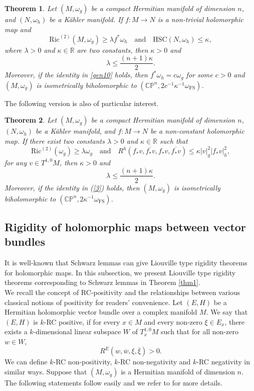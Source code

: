 \documentclass[12pt]{amsart}
\theoremstyle{plain}
\newtheorem{thm}{Theorem}[section]
\theoremstyle{definition}
\newcommand{\btheorem}{\begin{thm}}
\newcommand{\etheorem}{\end{thm}}
\renewcommand{\bar}{\overline}
\newcommand{\beq}{\begin{equation}}
\newcommand{\eeq}{\end{equation}}
\renewcommand{\hat}{\widehat}
\newcommand{\qtq}[1]{\quad\mbox{#1}\quad}
\renewcommand{\>}{\rightarrow}
\newcommand{\C}{{\mathbb C}}
\renewcommand{\P}{{\mathbb P}}
\newcommand{\R}{{\mathbb R}}
\newcommand{\Ric}{\mathrm{Ric}}
\newcommand{\om}{\omega}
\numberwithin{equation}{section} %
\begin{document}
\btheorem \label{main000}
Let $(M,\om_g)$ be a compact Hermitian manifold of dimension $n$,
and $(N,\om_h)$ be a K\"ahler manifold.  If  $f:M\to N$ is  a non-trivial holomorphic map and
\beq \Ric^{\mathrm{(2)}}(M, \omega_g) \ge \lambda f^*\omega_h\qtq{and} \mathrm{HSC}(N,\omega_h)\leq \kappa,
\label{gen1 condition0}
\eeq
where  $\lambda>0$ and $\kappa\in \R$ are two constants, then $\kappa>0$ and
\beq
\lambda\le \frac{\left(n+1\right)\kappa}{2}.  \label{gen10}
\eeq
Moreover, if the identity  in \eqref{gen10} holds,
then $f^*\om_h=c\om_g$ for some $c>0$
and $(M,\om_g)$ is isometrically biholomorphic to $\left(\C\P^n,2c^{-1}\kappa^{-1}\om_{\mathrm{FS}}\right)$.
\etheorem


\baselineskip

\noindent
The following  version  is also of particular interest.

\btheorem\label{11relative}
Let $(M,\om_g)$ be a compact Hermitian manifold of dimension $n$, $(N,\om_h)$ be a K\"ahler manifold,
and $f:M\to N$ be a non-constant holomorphic map.
If there exist two constants $\lambda>0$ and $\kappa\in \R$ such that 
\beq 
\Ric^{\mathrm{(2)}}(\omega_g)\ge \lambda \omega_g\qtq{and} R^h\left(f_*v,\bar{f_*v}, f_*v,\bar {f_*v}\right)\le \kappa |v|^2_g |f_*v|^2_h, 
\label{curvature11relative}
\eeq 	
for any $v\in T^{1,0}M$, then  $\kappa>0$ and
\beq
\lambda\le  \frac{\left(n+1\right)\kappa}{2}.\label{3}
\eeq 
Moreover, if the identity in (\ref{3}) holds, then $(M,\om_g)$ is isometrically biholomorphic to $\left(\C\P^n,2\kappa^{-1}\om_{\mathrm{FS}}\right)$.

\etheorem









\baselineskip


\subsection{Rigidity of holomorphic maps between vector bundles} It is well-known that Schwarz lemmas can give Liouville type rigidity theorems for holomorphic maps.  In this subsection, we present Liouville type rigidity theorems corresponding to Schwarz lemmas in Theorem \ref{thm1}.\\


We recall the concept of RC-positivity and the relationships between various classical notions of positivity for readers' convenience.  Let $(E,H)$ be a Hermitian holomorphic vector bundle over a complex manifold $M$.
We say that $(E,H)$ is $k$-RC positive, if for every $x\in M$ and every non-zero $\xi\in E_x$,
there exists a $k$-dimensional linear subspace $W$ of $T_x^{1,0}M$ such that for all non-zero $w\in W$,
\[
R^{E}\left(w,\bar{w},\xi,\bar \xi\right)>0.
\]
We can define $k$-RC non-positivity, $k$-RC non-negativity  and
$k$-RC negativity  in similar ways.  Suppose that $(M,\omega_g)$ is
a Hermitian manifold of dimension $n$.  The following statements
follow easily and we refer to \cite{Yan2018} for more details.
\end{document}
